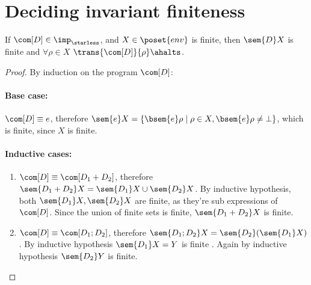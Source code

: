 \section{Deciding invariant finiteness}\label{sec:finiteness}

\begin{lemma}\label{le:finiteness}
  If \(\com[D]\in\imp_\starless\), and \(X \in \poset{env}\) is
  finite, then \(\sem{D}X\) is finite and \(\forall \rho \in X\)
  \(\trans{\com[D]}{\rho}\ahalts\).
\end{lemma}

\begin{proof}
  By induction on the program \(\com[D]\):
  \paragraph*{Base case:\\}
  \(\com[D] \equiv e\), therefore \(\sem{e}X = \{\bsem{e}\rho \mid
  \rho \in X , \bsem{e}\rho \neq \bot\}\), which is finite, since
  \(X\) is finite. %
  
  \paragraph*{Inductive cases:\\}
  \begin{enumerate}
  \item \(\com[D]\equiv \com[D_1 + D_2]\), therefore \(\sem{D_1 + D_2}
    X = \sem{D_1}X \cup \sem{D_2}X\). By inductive hypothesis, both
    \(\sem{D_1}X, \sem{D_2}X\) are finite, as they're sub expressions
    of \(\com[D]\). Since the union of finite sets is finite,
    \(\sem{D_1 + D_2}X\) is finite. %
  \item \(\com[D]\equiv \com[D_1; D_2]\), therefore \(\sem{D_1;D_2}X =
    \sem{D_2}(\sem{D_1}X)\). By inductive hypothesis \(\sem{D_1}X =
    Y\) is finite%
    . Again by inductive hypothesis
    \(\sem{D_2}Y\) is finite. %
  \end{enumerate}
\end{proof}

